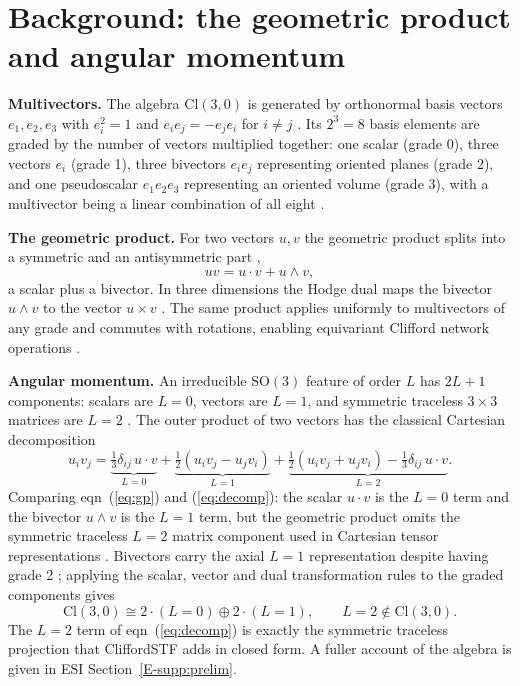 \section{Background: the geometric product and angular momentum}\label{sec:background}

\textbf{Multivectors.} The algebra $\mathrm{Cl}(3,0)$ is generated by orthonormal basis vectors $e_1,e_2,e_3$ with $e_i^2=1$ and $e_ie_j=-e_je_i$ for $i\neq j$ \cite{lounesto2001clifford}. Its $2^3=8$ basis elements are graded by the number of vectors multiplied together: one scalar (grade 0), three vectors $e_i$ (grade 1), three bivectors $e_ie_j$ representing oriented planes (grade 2), and one pseudoscalar $e_1e_2e_3$ representing an oriented volume (grade 3), with a multivector being a linear combination of all eight \cite{ruhe2023gcan}.

\textbf{The geometric product.} For two vectors $u,v$ the geometric product splits into a symmetric and an antisymmetric part \cite{brandstetter2022clifford},
\begin{equation}
uv = u\cdot v + u\wedge v ,
\label{eq:gp}
\end{equation}
a scalar plus a bivector. In three dimensions the Hodge dual maps the bivector $u\wedge v$ to the vector $u\times v$ \cite{doran2003geometric}. The same product applies uniformly to multivectors of any grade and commutes with rotations, enabling equivariant Clifford network operations \cite{ruhe2023cgenn}.

\textbf{Angular momentum.} An irreducible $\mathrm{SO}(3)$ feature of order $L$ has $2L{+}1$ components: scalars are $L{=}0$, vectors are $L{=}1$, and symmetric traceless $3\times3$ matrices are $L{=}2$ \cite{varshalovich1988quantum}. The outer product of two vectors has the classical Cartesian decomposition \cite{coope1965irreducible}
\begin{equation}
u_iv_j = \underbrace{\tfrac13\delta_{ij}\,u\cdot v}_{L=0} + \underbrace{\tfrac12(u_iv_j-u_jv_i)}_{L=1} + \underbrace{\tfrac12(u_iv_j+u_jv_i)-\tfrac13\delta_{ij}\,u\cdot v}_{L=2} .
\label{eq:decomp}
\end{equation}
Comparing eqn~(\ref{eq:gp}) and (\ref{eq:decomp}): the scalar $u\cdot v$ is the $L{=}0$ term and the bivector $u\wedge v$ is the $L{=}1$ term, but the geometric product omits the symmetric traceless $L{=}2$ matrix component used in Cartesian tensor representations \cite{simeon2023tensornet}. Bivectors carry the axial $L{=}1$ representation despite having grade 2 \cite{geiger2022e3nn}; applying the scalar, vector and dual transformation rules to the graded components gives
\begin{equation}
\mathrm{Cl}(3,0) \cong 2\cdot(L{=}0) \oplus 2\cdot(L{=}1), \qquad L{=}2 \notin \mathrm{Cl}(3,0) .
\label{eq:cl_irreps}
\end{equation}
The $L{=}2$ term of eqn~(\ref{eq:decomp}) is exactly the symmetric traceless projection that CliffordSTF adds in closed form. A fuller account of the algebra is given in ESI Section~\ref{E-supp:prelim}.
